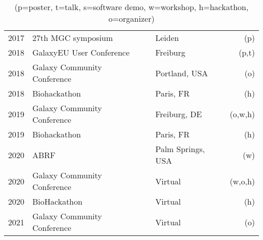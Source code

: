\begin{table}[h!]
\begin{tabular}{llp{0.5cm}lr}
        2017 & 27th MGC symposium                          && Leiden          & (p) \\
        2018 & GalaxyEU User Conference                    && Freiburg        & (p,t) \\
        2018 & Galaxy Community Conference                 && Portland, USA   & (o) \\
        2018 & Biohackathon                                && Paris, FR       & (h) \\
        2019 & Galaxy Community Conference                 && Freiburg, DE    & (o,w,h) \\
        2019 & Biohackathon                                && Paris, FR       & (h) \\
        2020 & ABRF                                        && Palm Springs, USA & (w) \\
        2020 & Galaxy Community Conference                 && Virtual         & (w,o,h) \\
        2020 & BioHackathon                                && Virtual         & (h) \\
        2021 & Galaxy Community Conference                 && Virtual         & (o) \\
    \end{tabular}
    \caption*{(p=poster, t=talk, s=software demo, w=workshop, h=hackathon, o=organizer)}
\end{table}


